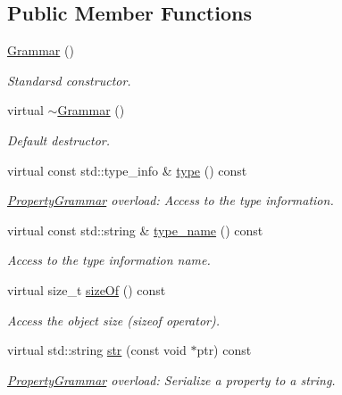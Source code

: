 \subsection*{Public Member Functions}
\begin{DoxyCompactItemize}
\item 
\hyperlink{class_d_d4hep_1_1_grammar_a38672ae640c8b5a7e36af4084878f74a}{Grammar} ()
\begin{DoxyCompactList}\small\item\em Standarsd constructor. \item\end{DoxyCompactList}\item 
virtual \hyperlink{class_d_d4hep_1_1_grammar_a53982c366a911db255f51de19d9ce9ef}{$\sim$Grammar} ()
\begin{DoxyCompactList}\small\item\em Default destructor. \item\end{DoxyCompactList}\item 
virtual const std::type\_\-info \& \hyperlink{class_d_d4hep_1_1_grammar_a5fcd84c1a1f9b641083264f6127cf431}{type} () const 
\begin{DoxyCompactList}\small\item\em \hyperlink{class_d_d4hep_1_1_property_grammar}{PropertyGrammar} overload: Access to the type information. \item\end{DoxyCompactList}\item 
virtual const std::string \& \hyperlink{class_d_d4hep_1_1_grammar_aeeaf492d2fab90c5d5fb032f7efaa42e}{type\_\-name} () const 
\begin{DoxyCompactList}\small\item\em Access to the type information name. \item\end{DoxyCompactList}\item 
virtual size\_\-t \hyperlink{class_d_d4hep_1_1_grammar_ab6c57bd9efbcd2964fa78864ebcf26c5}{sizeOf} () const 
\begin{DoxyCompactList}\small\item\em Access the object size (sizeof operator). \item\end{DoxyCompactList}\item 
virtual std::string \hyperlink{class_d_d4hep_1_1_grammar_a314d7a19d5f14066677c5fe3f2338291}{str} (const void $\ast$ptr) const 
\begin{DoxyCompactList}\small\item\em \hyperlink{class_d_d4hep_1_1_property_grammar}{PropertyGrammar} overload: Serialize a property to a string. \item\end{DoxyCompactList}\item 

\end{DoxyCompactItemize}
